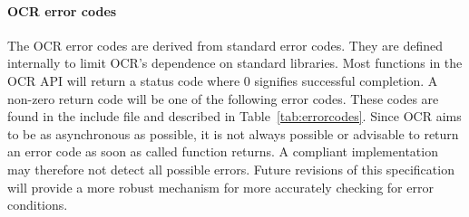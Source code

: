 \paragraph*{OCR error codes}
The OCR error codes are derived from standard error codes. They are defined
internally to limit OCR's dependence on standard libraries. Most functions in the
OCR API will return a status code where 0 signifies successful completion. A non-zero
return code will be one of the following error codes. These codes are found
in the  include file and described in Table~\ref{tab:errorcodes}.
Since OCR aims to be as asynchronous as possible, it is not always
possible or advisable to return an error code as soon as called
function returns. A compliant implementation may therefore not detect
all possible errors. Future revisions of this specification will
provide a more robust mechanism for more accurately checking for error conditions.
\tablelasttail{\hline}
